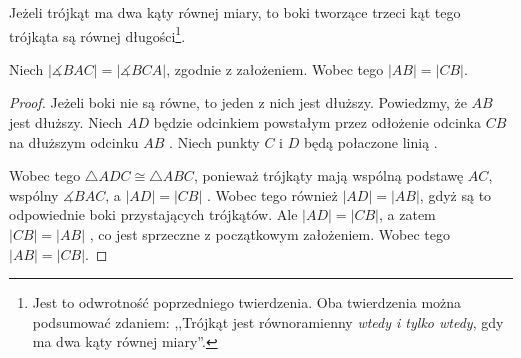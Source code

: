 \documentclass[12pt, a4paper]{scrartcl}
\begin{document}
\begin{theorem}
  Jeżeli trójkąt ma dwa kąty równej miary, to boki tworzące trzeci kąt tego
  trójkąta są równej długości\footnote{
      Jest to odwrotność poprzedniego twierdzenia. Oba twierdzenia można
      podsumować zdaniem: ,,Trójkąt jest równoramienny \emph{wtedy i tylko
      wtedy}, gdy ma dwa kąty równej miary''.
  }.

  \begin{figure}[!ht]
      \begin{center}
      \end{center}
  \end{figure}

Niech \(|\measuredangle BAC| = |\measuredangle BCA|\), zgodnie z założeniem.
Wobec tego \(|AB| = |CB|\).

\begin{proof}
    Jeżeli boki nie są równe, to jeden z nich jest dłuższy. Powiedzmy, że \(AB\)
    jest dłuższy. Niech \(AD\) będzie odcinkiem powstałym przez odłożenie
    odcinka \(CB\) na dłuższym odcinku \(AB\) . Niech punkty \(C\) i
    \(D\) będą połaczone linią .

    Wobec tego \(\triangle ADC \cong \triangle ABC\), ponieważ trójkąty mają
    wspólną podstawę \(AC\), wspólny \(\measuredangle BAC\), a \(|AD| = |CB|\)
    . Wobec tego również \(|AD| = |AB|\), gdyż są to odpowiednie boki
    przystających trójkątów. Ale \(|AD| = |CB|\), a zatem \(|CB| = |AB|\)
    , co jest sprzeczne z początkowym założeniem. Wobec tego
    \(|AB| = |CB|\).
\end{proof}
\end{theorem}
\end{document}
